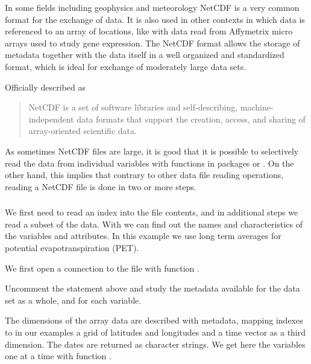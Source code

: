\documentclass[krantz2,ChapterTOCs]{krantz}\usepackage{knitr}
\begin{document}
In some fields including geophysics and meteorology NetCDF is a very common format for the exchange of data. It is also used in other contexts in which data is referenced to an array of locations, like with data read from Affymetrix micro arrays used to study gene expression. The NetCDF format allows the storage of metadata together with the data itself in a well organized and standardized format, which is ideal for exchange of moderately large data sets.

Officially described as
\begin{quote}
NetCDF is a set of software libraries and self-describing, machine-independent data formats that support the creation, access, and sharing of array-oriented scientific data.
\end{quote}

As sometimes NetCDF files are large, it is good that it is possible to selectively read the data from individual variables with functions in packages  or . On the other hand, this implies that contrary to other data file reading operations, reading a NetCDF file is done in two or more steps.

\subsubsection[ncdf4]{}

We first need to read an index into the file contents, and in additional steps we read a subset of the data. With  we can find out the names and characteristics of the variables and attributes. In this example we use long term averages for potential evapotranspiration (PET).

We first open a connection to the file with function .

\begin{knitrout}\footnotesize
{}\color{fgcolor}\begin{kframe}
\begin{alltt}
 \hlkwb{<-} \hlstd{(}\hlstd{)}
\end{alltt}
\end{kframe}
\end{knitrout}

\begin{playground}
Uncomment the  statement above and study the metadata available for the data set as a whole, and for each variable.
\end{playground}
The dimensions of the array data are described with metadata, mapping indexes to in our examples a grid of latitudes and longitudes and a time vector as a third dimension. The dates are returned as character strings. We get here the variables one at a time with function .
\end{document}
